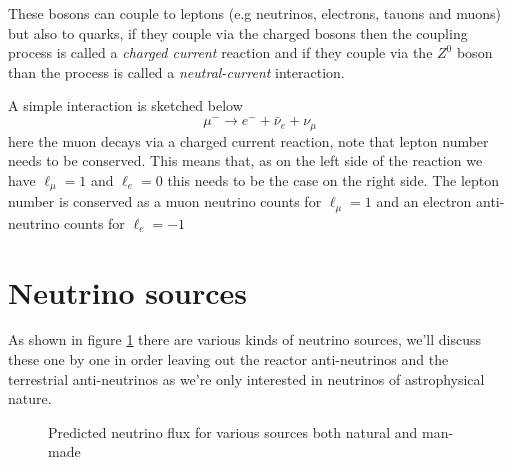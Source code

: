 \documentclass[11pt,a4paper,faculty=we,language=en,doctype=report]{cls/ugent-doc}
\begin{document}
These bosons can couple to leptons (e.g neutrinos, electrons, tauons and muons)
but also to quarks, if they couple via the charged bosons then the coupling process
is called a \textit{charged current} reaction and if they couple via the $Z^0$ boson
than the process is called a \textit{neutral-current} interaction.

A simple interaction is sketched below
\begin{equation}
  \mu^- \rightarrow e^- + \bar{\nu}_e + \nu_\mu
\end{equation}
here the muon decays via a charged current reaction, note that lepton number needs to be conserved.
This means that, as on the left side of the reaction we have $\ell_\mu = 1$ and $\ell_e = 0$ this needs
to be the case on the right side. The lepton number is conserved as a muon neutrino counts for $\ell_\mu = 1$
and an electron anti-neutrino counts for $\ell_e = -1$
\section{Neutrino sources}
As shown in figure \ref{figure:Neutrino fluxes} there are various kinds of
neutrino sources, we'll discuss these one by one in order leaving out the
reactor anti-neutrinos and the terrestrial anti-neutrinos as we're only
interested in neutrinos of astrophysical nature.
\begin{figure}
	\centering
	\caption{Predicted neutrino flux for various sources both natural and man-made}
	\label{figure:Neutrino fluxes}
\end{figure}
\end{document}
